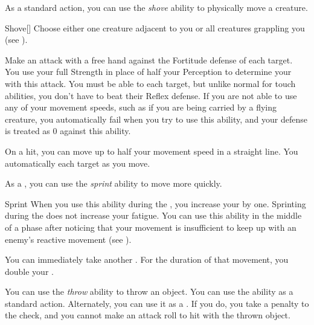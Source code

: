         \label{Shove} As a standard action, you can use the \textit{shove} ability to physically move a creature.

        \begin{activeability}{Shove}[]
            \rankline
            Choose either one creature adjacent to you or all creatures grappling you (see ).

            Make an attack with a free hand against the Fortitude defense of each target.
            You use your full Strength in place of half your Perception to determine your  with this attack.
            You must be able to  each target, but unlike normal for touch abilities, you don't have to beat their Reflex defense.
            If you are not able to use any of your movement speeds, such as if you are being carried by a flying creature, you automatically fail when you try to use this ability, and your defense is treated as 0 against this ability.

            On a hit, you can move up to half your movement speed in a straight line.
            You automatically  each target as you move.
        \end{activeability}

        \label{Sprint} As a , you can use the \textit{sprint} ability to move more quickly.

        \begin{activeability}{Sprint}
            \rankline
            When you use this ability during the , you increase your  by one.
            Sprinting during the  does not increase your fatigue.
            You can use this ability in the middle of a phase after noticing that your movement is insufficient to keep up with an enemy's reactive movement (see ).

            You can immediately take another .
            For the duration of that movement, you double your .
        \end{activeability}

        \label{Throw} You can use the \textit{throw} ability to throw an object.
        You can use the ability as a standard action.
        Alternately, you can use it as a .
        If you do, you take a  penalty to the check, and you cannot make an attack roll to hit with the thrown object.

